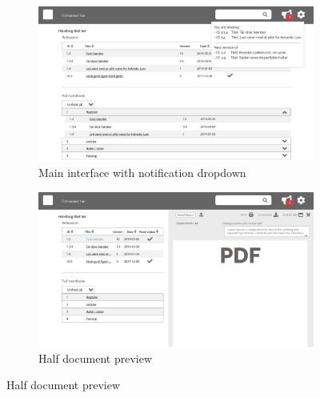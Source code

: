 \begin{figure}[H]\ContinuedFloat
	\centering
	\begin{subfigure}[b]{0.48\textwidth}
		\includegraphics[width=\textwidth]{billeder/iteration2Prototyper/Page_3.jpg}
		\caption{Main interface with notification dropdown}
		\label{fig:4-MainDrop}
	\end{subfigure}
	\quad
	\begin{subfigure}[b]{0.48\textwidth}
		\includegraphics[width=\textwidth]{billeder/iteration2Prototyper/Page_4.jpg}
		\caption{Half document preview}
		\label{fig:4-DocPreviewHalf}
	\end{subfigure}
\end{figure}

